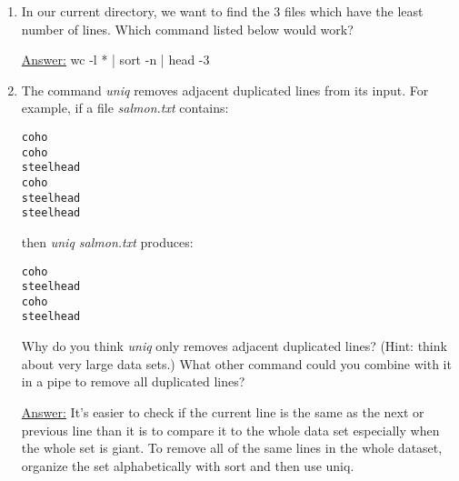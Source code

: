 \documentclass[12pt]{article}
\begin{document}
\begin{enumerate}
\item In our current directory, we want to find the 3 files which have the least number of lines. Which command listed below would work?
\begin{center}
\textsf{\underline{Answer:} wc -l * | sort -n | head -3}
\end{center}

\item The command \emph{uniq} removes adjacent duplicated lines from its input. For example, if a file \emph{salmon.txt} contains:
\begin{flushleft}
\texttt{coho \\ coho \\ steelhead \\ coho \\ steelhead \\ steelhead}
\end{flushleft}
then \emph{uniq salmon.txt} produces:
\begin{flushleft}
\texttt{coho \\ steelhead \\ coho \\ steelhead}
\end{flushleft}
Why do you think \emph{uniq} only removes adjacent duplicated lines? (Hint: think about very large data sets.) What other command could you combine with it in a pipe to remove all duplicated lines?
\begin{center}
\textsf{\underline{Answer:} It’s easier to check if the current line is the same as the next or previous line than it is to compare it to the whole data set especially when the whole set is giant. To remove all of the same lines in the whole dataset, organize the set alphabetically with sort and then use uniq.}
\end{center}

\end{enumerate}
\end{document}

